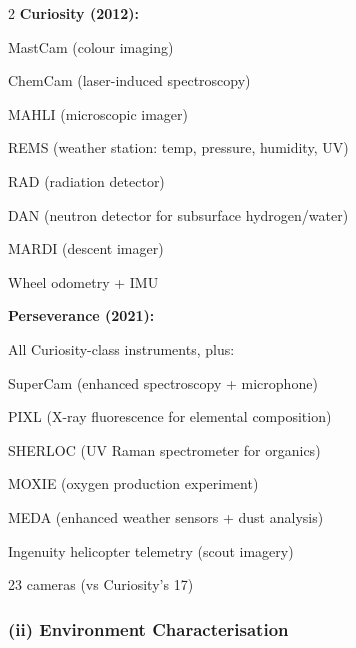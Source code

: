 \documentclass[12pt, a4paper]{article}
\begin{document}
\begin{multicols}{2}
\textbf{Curiosity (2012):}
\begin{keypoints}
  \item MastCam (colour imaging)
  \item ChemCam (laser-induced spectroscopy)
  \item MAHLI (microscopic imager)
  \item REMS (weather station: temp, pressure, humidity, UV)
  \item RAD (radiation detector)
  \item DAN (neutron detector for subsurface hydrogen/water)
  \item MARDI (descent imager)
  \item Wheel odometry + IMU
\end{keypoints}

\columnbreak

\textbf{Perseverance (2021):}
\begin{keypoints}
  \item All Curiosity-class instruments, plus:
  \item SuperCam (enhanced spectroscopy + microphone)
  \item PIXL (X-ray fluorescence for elemental composition)
  \item SHERLOC (UV Raman spectrometer for organics)
  \item MOXIE (oxygen production experiment)
  \item MEDA (enhanced weather sensors + dust analysis)
  \item Ingenuity helicopter telemetry (scout imagery)
  \item 23 cameras (vs Curiosity's 17)
\end{keypoints}
\end{multicols}

\subsubsection*{(ii) Environment Characterisation}
\end{document}
